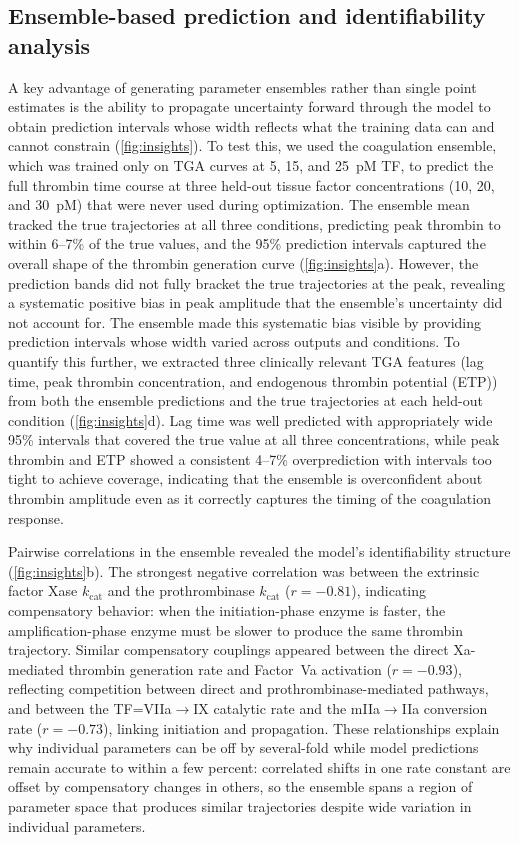 \documentclass[12pt]{article}
\begin{document}
\subsection{Ensemble-based prediction and identifiability analysis}\label{sec:ensemble_insights}
A key advantage of generating parameter ensembles rather than single point estimates is the ability to propagate uncertainty forward through the model to obtain prediction intervals whose width reflects what the training data can and cannot constrain (\cref{fig:insights}). To test this, we used the coagulation ensemble, which was trained only on TGA curves at 5, 15, and 25~pM TF, to predict the full thrombin time course at three held-out tissue factor concentrations (10, 20, and 30~pM) that were never used during optimization. The ensemble mean tracked the true trajectories at all three conditions, predicting peak thrombin to within 6--7\% of the true values, and the 95\% prediction intervals captured the overall shape of the thrombin generation curve (\cref{fig:insights}a). However, the prediction bands did not fully bracket the true trajectories at the peak, revealing a systematic positive bias in peak amplitude that the ensemble's uncertainty did not account for. The ensemble made this systematic bias visible by providing prediction intervals whose width varied across outputs and conditions. To quantify this further, we extracted three clinically relevant TGA features (lag time, peak thrombin concentration, and endogenous thrombin potential (ETP)) from both the ensemble predictions and the true trajectories at each held-out condition (\cref{fig:insights}d). Lag time was well predicted with appropriately wide 95\% intervals that covered the true value at all three concentrations, while peak thrombin and ETP showed a consistent 4--7\% overprediction with intervals too tight to achieve coverage, indicating that the ensemble is overconfident about thrombin amplitude even as it correctly captures the timing of the coagulation response.

Pairwise correlations in the ensemble revealed the model's identifiability structure (\cref{fig:insights}b). The strongest negative correlation was between the extrinsic factor Xase $k_{\text{cat}}$ and the prothrombinase $k_{\text{cat}}$ ($r = -0.81$), indicating compensatory behavior: when the initiation-phase enzyme is faster, the amplification-phase enzyme must be slower to produce the same thrombin trajectory. Similar compensatory couplings appeared between the direct Xa-mediated thrombin generation rate and Factor~Va activation ($r = -0.93$), reflecting competition between direct and prothrombinase-mediated pathways, and between the TF=VIIa$\to$IX catalytic rate and the mIIa$\to$IIa conversion rate ($r = -0.73$), linking initiation and propagation. These relationships explain why individual parameters can be off by several-fold while model predictions remain accurate to within a few percent: correlated shifts in one rate constant are offset by compensatory changes in others, so the ensemble spans a region of parameter space that produces similar trajectories despite wide variation in individual parameters.
\end{document}
